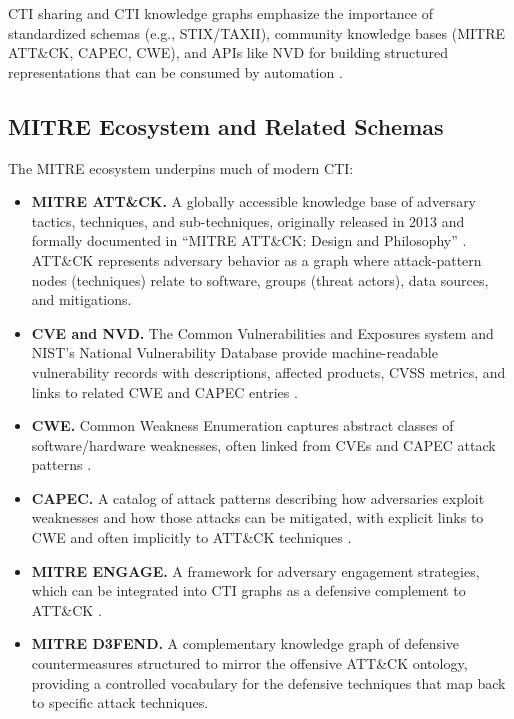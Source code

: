 \documentclass[webpdf,contemporary,large]{oup-authoring-template}
\theoremstyle{thmstyleone}
\theoremstyle{thmstyletwo}
\theoremstyle{thmstylethree}
\begin{document}
CTI sharing and CTI knowledge graphs emphasize the importance of standardized schemas (e.g., STIX/TAXII), community knowledge bases (MITRE ATT\&CK, CAPEC, CWE), and APIs like NVD for building structured representations that can be consumed by automation \cite{strom2018mitreattck,mitreCVE,mitreCWE,mitreCAPEC}.

\subsection{MITRE Ecosystem and Related Schemas}

The MITRE ecosystem underpins much of modern CTI:

\begin{itemize}
  \item \textbf{MITRE ATT\&CK.} A globally accessible knowledge base of adversary tactics, techniques, and sub-techniques, originally released in 2013 and formally documented in ``MITRE ATT\&CK: Design and Philosophy'' \cite{strom2018mitreattck}. ATT\&CK represents adversary behavior as a graph where attack-pattern nodes (techniques) relate to software, groups (threat actors), data sources, and mitigations.
  \item \textbf{CVE and NVD.} The Common Vulnerabilities and Exposures system and NIST's National Vulnerability Database provide machine-readable vulnerability records with descriptions, affected products, CVSS metrics, and links to related CWE and CAPEC entries \cite{mitreCVE}.
  \item \textbf{CWE.} Common Weakness Enumeration captures abstract classes of software/hardware weaknesses, often linked from CVEs and CAPEC attack patterns \cite{mitreCWE}.
  \item \textbf{CAPEC.} A catalog of attack patterns describing how adversaries exploit weaknesses and how those attacks can be mitigated, with explicit links to CWE and often implicitly to ATT\&CK techniques \cite{mitreCAPEC}.
  \item \textbf{MITRE ENGAGE.} A framework for adversary engagement strategies, which can be integrated into CTI graphs as a defensive complement to ATT\&CK \cite{cardei2025ift}.
  \item \textbf{MITRE D3FEND.} A complementary knowledge graph of defensive countermeasures structured to mirror the offensive ATT\&CK ontology, providing a controlled vocabulary for the defensive techniques that map back to specific attack techniques.
\end{itemize}
\end{document}
